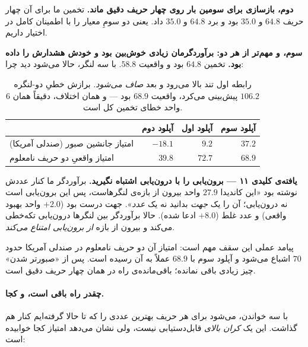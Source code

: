 \documentclass[12pt,a4paper]{article}
\begin{document}
\textbf{دوم، بازسازی برای سومین بار روی چهار حریف دقیق ماند.} تخمین ما
برای آن چهار حریف $64.8$ و $35.0$ بود و برد $64.8$ و $35.0$ داد. یعنی
دو سومِ معیار را با اطمینان کامل در اختیار داریم.

\textbf{سوم، و مهم‌تر از هر دو: برآوردگرمان زیادی خوش‌بین بود و خودش
هشدارش را داده بود.} تخمین $64.8$ بود و واقعیت $58.8$. با سه لنگر، حالا
می‌شود دید چرا:

\begin{table}[h]\centering\small
\begin{tabular}{lrrr}
\toprule
 & آپلود دوم & آپلود اول & آپلود سوم\\
\midrule
امتیاز جانشین صبور (صندلی آمریکا) & $-18.1$ & $9.2$  & $37.2$\\
امتیاز واقعیِ دو حریف نامعلوم     & $39.8$  & $72.7$ & $68.9$\\
\bottomrule
\end{tabular}
\caption{رابطه اول تند بالا می‌رود و بعد \emph{صاف می‌شود}. برازش خطیِ
دو-لنگره $106.2$ پیش‌بینی می‌کرد، واقعیت $68.9$ بود — و همان اختلاف،
دقیقاً همان $6$ واحد خطای تخمین کل است.}
\end{table}

\begin{findbox}
\textbf{یافته‌ی کلیدی ۱۱ — برون‌یابی را با درون‌یابی اشتباه نگیرید.}
برآوردگر ما کنار عددش نوشته بود «این کاندیدا $27.9$ واحد بیرون از بازه‌ی
لنگرهاست، پس این برون‌یابی است نه درون‌یابی؛ آن را یک \emph{جهت} بدانید
نه یک \emph{عدد}». جهت درست بود ($+2.0$ واحد بهبود واقعی) و عدد غلط
($+8.0$ ادعا شده). حالا برآوردگر بین لنگرها درون‌یابی تکه‌خطی می‌کند و
بیرون از بازه \emph{از برون‌یابی امتناع می‌کند}.
\end{findbox}

پیامد عملی این سقف مهم است: امتیاز آن دو حریف نامعلوم در صندلی آمریکا
حدود $70$ اشباع می‌شود و آپلود سوم با $68.9$ عملاً به آن رسیده است. پس از
«صبورتر شدن» چیز زیادی باقی نمانده؛ باقی‌مانده‌ی راه در همان چهار حریف
دقیق است.

\paragraph{چقدر راه باقی است، و کجا.}
با سه خواندن، می‌شود برای هر حریف بهترین عددی را که تا حالا گرفته‌ایم
کنار هم گذاشت. این یک \emph{کران بالای} قابل‌دستیابی نیست، ولی نشان
می‌دهد امتیاز کجا خوابیده است:
\end{document}
